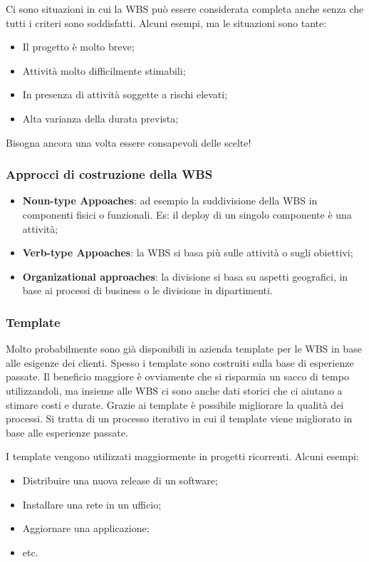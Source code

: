 \begin{warn}
	Ci sono situazioni in cui la WBS può essere considerata completa anche senza che tutti i criteri sono soddisfatti. Alcuni esempi, ma le situazioni sono tante:
	\begin{itemize}
		\item Il progetto è molto breve;
		\item Attività molto difficilmente stimabili;
		\item In presenza di attività soggette a rischi elevati;
		\item Alta varianza della durata prevista;
	\end{itemize}
	Bisogna ancora una volta essere consapevoli delle scelte!
\end{warn}
\subsubsection{Approcci di costruzione della WBS}
\begin{itemize}
	\item \textbf{Noun-type Appoaches}: ad esempio la suddivisione della WBS in componenti fisici o funzionali. Es: il deploy di un singolo componente è una attività;
	\item \textbf{Verb-type Appoaches}: la WBS si basa più sulle attività o sugli obiettivi;
	\item \textbf{Organizational approaches}: la divisione si basa su aspetti geografici, in base ai processi di business o le divisione in dipartimenti.
\end{itemize}
\subsubsection{Template}
Molto probabilmente sono già disponibili in azienda template per le WBS in base alle esigenze dei clienti. Spesso i template sono costruiti sulla base di esperienze passate. Il beneficio maggiore è ovviamente che si risparmia un sacco di tempo utilizzandoli, ma insieme alle WBS ci sono anche dati storici che ci aiutano a stimare costi e durate. Grazie ai template è possibile migliorare la qualità dei processi. Si tratta di un processo iterativo in cui il template viene migliorato in base alle esperienze passate.

\noindent I template vengono utilizzati maggiormente in progetti ricorrenti. Alcuni esempi:
\begin{itemize}
	\item Distribuire una nuova release di un software;
	\item Installare una rete in un ufficio;
	\item Aggiornare una applicazione;
	\item etc.
\end{itemize}
